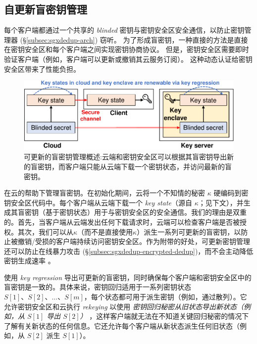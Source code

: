 \subsection{自更新盲密钥管理}
\label{subsec:sgxdedup-key-management}

每个客户端都通过一个共享的 \textit{ blinded} 密钥与密钥安全区安全通信，以防止密钥管理器 (\S\ref{subsec:sgxdedup-arch}) 窃听。 为了形成盲密钥，一种直接的方法是直接在密钥安全区和每个客户端之间实现密钥协商协议。 但是，密钥安全区需要即时验证客户端（例如，客户端可以更新或撤销其云服务订阅）。 这种动态认证给密钥安全区带来了性能负担。


\begin{figure}[t]
\centering
\includegraphics[width=\textwidth]{pic/sgxdedup/blindkey.pdf}
\vspace{-16pt}
\caption{可更新的盲密钥管理概述:云端和密钥安全区可以根据其盲密钥导出新的盲密钥，而客户端只能从云端下载一个密钥状态，并访问最新的盲密钥。}
\label{fig:sgxdedup-keymanage}
\end{figure}

\sysnameS 在云的帮助下管理盲密钥。在初始化期间，云将一个不知情的秘密 $\kappa$ 硬编码到密钥安全区代码中。每个客户端从云端下载一个 \textit{ key state}（源自 $\kappa$；见下文），并生成其盲密钥（基于密钥状态）用于与密钥安全区的安全通信。我们的理由是双重的。首先，当客户端从云端发出任何下载请求时，云端可以检查客户端是否被授权。其次，我们可以从$\kappa$（而不是直接使用$\kappa$）派生一系列可更新的盲密钥，以防止被撤销/受损的客户端持续访问密钥安全区。作为附带的好处，可更新密钥管理还可以防止在线暴力攻击 (\S\ref{subsec:sgxdedup-encrypted-dedup})，而不会主动降低密钥生成速率 \cite{bellare13b}。

\sysnameS 使用 \textit{ key regression} \cite{fu06} 导出可更新的盲密钥，同时确保每个客户端和密钥安全区中的盲密钥是一致的。具体来说，密钥回归适用于一系列密钥状态 $S[1]、S[2]、\ldots、S[m]$，每个状态都可用于派生密钥（例如，通过散列）。它允许密钥安全区和云执行 \textit{ rekeying} 以使用 \textit{ 密钥回归秘密从旧状态导出新状态（例如，从 $S[1]$ 导出 $S[2]$） }，这样客户端就无法在不知道关键回归秘密的情况下了解有关新状态的任何信息。它还允许每个客户端从新状态派生任何旧状态（例如，从 $S[2]$ 派生 $S[1]$）。

